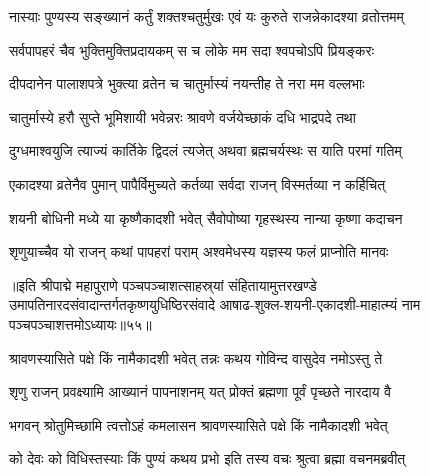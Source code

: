 \twolineshloka
{नास्याः पुण्यस्य सङ्ख्यानं कर्तुं शक्तश्चतुर्मुखः}
{एवं यः कुरुते राजन्नेकादश्या व्रतोत्तमम्}%

\twolineshloka
{सर्वपापहरं चैव भुक्तिमुक्तिप्रदायकम्}
{स च लोके मम सदा श्वपचोऽपि प्रियङ्करः}%

\twolineshloka
{दीपदानेन पालाशपत्रे भुक्त्या व्रतेन च}
{चातुर्मास्यं नयन्तीह ते नरा मम वल्लभाः}%

\twolineshloka
{चातुर्मास्ये हरौ सुप्ते भूमिशायी भवेन्नरः}
{श्रावणे वर्जयेच्छाकं  दधि भाद्रपदे तथा}%

\twolineshloka
{दुग्धमाश्वयुजि त्याज्यं कार्तिके द्विदलं त्यजेत्}
{अथवा ब्रह्मचर्यस्थः स याति परमां गतिम्}%

\twolineshloka
{एकादश्या व्रतेनैव पुमान् पापैर्विमुच्यते}
{कर्तव्या सर्वदा राजन् विस्मर्तव्या न कर्हिचित्}%

\twolineshloka
{शयनी बोधिनी मध्ये या कृष्णैकादशी भवेत्}
{सैवोपोष्या गृहस्थस्य नान्या कृष्णा कदाचन}%

\twolineshloka
{शृणुयाच्चैव यो राजन् कथां पापहरां पराम्}
{अश्वमेधस्य यज्ञस्य फलं प्राप्नोति मानवः}%

॥इति श्रीपाद्मे महापुराणे पञ्चपञ्चाशत्साहस्र्यां संहितायामुत्तरखण्डे उमापतिनारदसंवादान्तर्गतकृष्णयुधिष्ठिरसंवादे आषाढ-शुक्ल-शयनी-एकादशी-माहात्म्यं नाम पञ्चपञ्चाशत्तमोऽध्यायः॥५५॥

\genMangalaShloka

\hyperref[sec:ekadashi_mahatmyam_padma_puranam]{\closesub}
\clearpage

\label{sec:padma-shravana-krishna-kamika}

\ganapatyadiDhyanam
\padmaPuranam



\twolineshloka
{श्रावणस्यासिते पक्षे किं नामैकादशी भवेत्}
{तन्नः कथय गोविन्द वासुदेव नमोऽस्तु ते}%


\twolineshloka
{शृणु राजन् प्रवक्ष्यामि आख्यानं पापनाशनम्}
{यत् प्रोक्तं ब्रह्मणा पूर्वं पृच्छते नारदाय वै}%


\twolineshloka
{भगवन् श्रोतुमिच्छामि त्वत्तोऽहं कमलासन}
{श्रावणस्यासिते पक्षे किं नामैकादशी भवेत्}%

\twolineshloka
{को देवः को विधिस्तस्याः किं पुण्यं कथय प्रभो}
{इति तस्य वचः श्रुत्वा ब्रह्मा वचनमब्रवीत्}%

